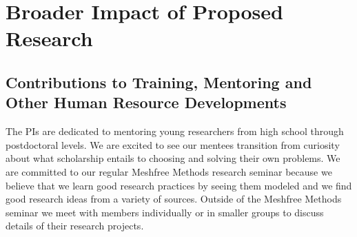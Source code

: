 \documentclass[11pt]{NSFamsart}
\begin{document}


\section{Broader Impact of Proposed Research}\label{SectBroad}


\subsection{Contributions to Training, Mentoring and Other Human Resource Developments}

The PIs are dedicated to mentoring young researchers from high school through postdoctoral levels.  We are excited to see our mentees transition from curiosity about what scholarship entails to choosing and solving their own problems.  We are committed to our regular Meshfree Methods research seminar because we believe that we learn good research practices by seeing them modeled and we find good research ideas from a variety of sources. Outside of the Meshfree Methods seminar we meet with members individually or in smaller groups to discuss details of their research projects.
\end{document}
